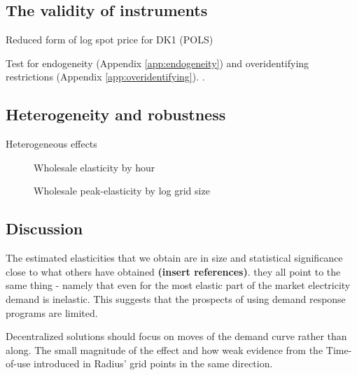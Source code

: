 \subsection{The validity of instruments}
\label{subsec:r_validity}

\begin{table}[H]
  \centering
  \caption{Reduced form of log spot price for DK1 (POLS)}
  \label{tab:reduced_form_price_dk1}
  \footnotesize
        
\end{table}
Test for endogeneity (Appendix \ref{app:endogeneity}) and overidentifying restrictions (Appendix \ref{app:overidentifying}). \citep{statacorp2017stata}.
\medskip\\


\subsection{Heterogeneity and robustness}
\label{subsec:r_robustness}


Heterogeneous effects
\begin{figure}[H]
  \centering
  \caption{Wholesale elasticity by hour}
  \label{fig:ws_elasticity_hour}
\end{figure}

\begin{figure}[H]
  \centering
  \caption{Wholesale peak-elasticity by log grid size}
  \label{fig:ws_elasticity_grid}
\end{figure}


\subsection{Discussion}
\label{subsec:r_discussion}

The estimated elasticities that we obtain are in size and statistical significance close to what others have obtained\textbf{ (insert references)}.  they all point to the same thing - namely that even for the most elastic part of the market electricity demand is inelastic. This suggests that the prospects of using demand response programs are limited.

Decentralized solutions should focus on moves of the demand curve rather than along.
The small magnitude of the effect and how weak evidence from the Time-of-use introduced in Radius' grid points in the same direction.
\par

